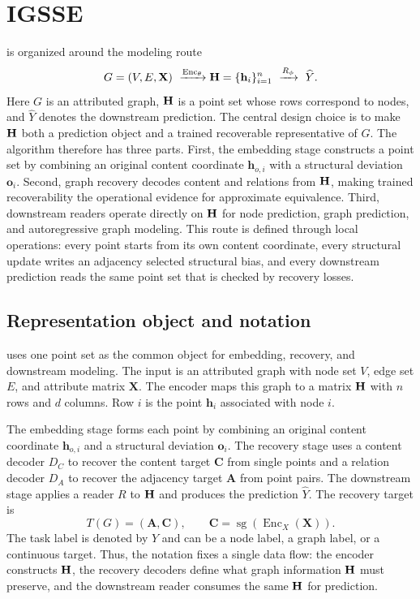 \section{IGSSE}
\label{sec:method}

\method{} is organized around the modeling route
\begin{equation}
 G=(V,E,\mathbf X)\ \xrightarrow{\operatorname{Enc}_{\theta}}
 \Hset=\{\mathbf h_i\}_{i=1}^{n}\ \xrightarrow{R_{\phi}}\ \widehat Y .
 \label{eq:ghy}
\end{equation}
Here $G$ is an attributed graph, $\mathbf{H}$ is a point set whose rows correspond to nodes, and
$\widehat Y$ denotes the downstream prediction.  The central design choice is to
make $\mathbf{H}$ both a prediction object and a trained recoverable representative
of $G$.
The algorithm therefore has three parts.  First, the embedding stage constructs a
point set by combining an original content coordinate $\mathbf h_{o,i}$ with a
structural deviation $\mathbf o_i$.  Second, graph recovery decodes content and
relations from $\mathbf{H}$, making trained recoverability the operational evidence
for approximate equivalence.  Third, downstream readers operate directly on $\mathbf{H}$ for node
prediction, graph prediction, and autoregressive graph modeling.
This route is defined through local operations: every point starts from its own
content coordinate, every structural update writes an adjacency selected
structural bias, and every downstream prediction reads the same point set that is
checked by recovery losses.

\subsection{Representation object and notation}
\label{sec:setup}
\method{} uses one point set as the common object for embedding, recovery, and
downstream modeling.  The input is an attributed graph with node set $V$, edge
set $E$, and attribute matrix $\mathbf X$.  The encoder maps this graph to a
matrix $\mathbf{H}$ with $n$ rows and $d$ columns.  Row $i$ is the point
$\mathbf h_i$ associated with node $i$.

The embedding stage forms each point by combining an original content coordinate
$\mathbf h_{o,i}$ and a structural deviation $\mathbf o_i$.  The recovery stage
uses a content decoder $D_C$ to recover the content target $\mathbf C$ from
single points and a relation decoder $D_A$ to recover the adjacency target
$\mathbf A$ from point pairs.  The downstream stage applies a reader $R$ to
$\mathbf{H}$ and produces the prediction $\widehat Y$.  The recovery target is
\begin{equation}
 T(G)=(\mathbf A,\mathbf C),\qquad
 \mathbf C=\operatorname{sg}(\operatorname{Enc}_{X}(\mathbf X)).
 \label{eq:recovery-target}
\end{equation}
The task label is denoted by $Y$ and can be a node label, a graph label, or a
continuous target.  Thus, the notation fixes a single data flow: the encoder
constructs $\mathbf{H}$, the recovery decoders define what graph information
$\mathbf{H}$ must preserve, and the downstream reader consumes the same $\mathbf{H}$ for
prediction.

